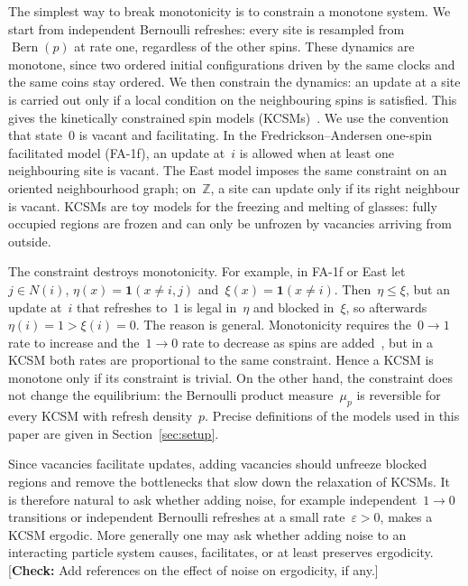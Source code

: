 \documentclass[EJP,preprint,NODS,nobera]{ejpecp}
\newcommand{\Z}{\mathbb{Z}}
\newcommand{\ind}{\mathbf{1}}
\newcommand{\authorcheck}[1]{{\color{blue}[\textbf{Check:} #1]}}
\begin{document}
The simplest way to break monotonicity is to constrain a monotone system. We
start from independent Bernoulli refreshes: every site is resampled
from~$\operatorname{Bern}(p)$ at rate one, regardless of the other spins.
These dynamics are monotone, since two ordered initial configurations driven
by the same clocks and the same coins stay ordered. We then constrain the
dynamics: an update at a site is carried out only if a local condition on the
neighbouring spins is satisfied. This gives the kinetically constrained spin
models (KCSMs)~\cite{FredricksonAndersen1984,CancriniEtAl2008,HartarskyToninelli2025}.
We use the convention that state~$0$ is vacant and facilitating. In the
Fredrickson--Andersen one-spin facilitated model (FA-1f), an update at~$i$ is
allowed when at least one neighbouring site is vacant. The East model imposes
the same constraint on an oriented neighbourhood graph; on~$\Z$, a site can
update only if its right neighbour is vacant. KCSMs are toy models for the
freezing and melting of glasses: fully occupied regions are frozen and can
only be unfrozen by vacancies arriving from outside.

The constraint destroys monotonicity. For example, in FA-1f or East
let~$j\in N(i)$, $\eta(x)=\ind(x\neq i,j)$ and~$\xi(x)=\ind(x\neq i)$.
Then~$\eta\leq\xi$, but an update at~$i$ that refreshes to~$1$ is legal
in~$\eta$ and blocked in~$\xi$, so afterwards~$\eta(i)=1>\xi(i)=0$. The
reason is general. Monotonicity requires the~$0\to1$ rate to increase and
the~$1\to0$ rate to decrease as spins are added~\cite[Chapter~III,
Definition~2.1 and Theorem~2.2]{Liggett1985}, but in a KCSM both rates are
proportional to the same constraint. Hence a KCSM is monotone only if its
constraint is trivial. On the other hand, the constraint does not change the
equilibrium: the Bernoulli product measure~$\mu_p$ is reversible for every
KCSM with refresh density~$p$. Precise definitions of the models used in this
paper are given in Section~\ref{sec:setup}.

Since vacancies facilitate updates, adding vacancies should unfreeze
blocked regions and remove the bottlenecks that slow down the relaxation of
KCSMs. It is therefore natural to ask whether adding noise, for example
independent~$1\to0$ transitions or independent Bernoulli refreshes at a small
rate~$\varepsilon>0$, makes a KCSM ergodic. More generally one may ask
whether adding noise to an interacting particle system causes, facilitates,
or at least preserves ergodicity.
\authorcheck{Add references on the effect of noise on ergodicity, if any.}
\end{document}
